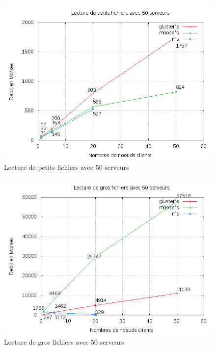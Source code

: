 \documentclass[12pt]{report}
\begin{document}
\begin{figure}[H]
\begin{center}
\includegraphics[bb=0 0 640 480,width=12cm]{images/srv50rs2.png}
\caption{Lecture de petits fichiers avec 50 serveurs}
\end{center}
\end{figure} 
\begin{figure}[H]
\begin{center}
\includegraphics[bb=0 0 640 480,width=12cm]{images/srv50rb2.png}
\caption{Lecture de gros fichiers avec 50 serveurs}
\end{center}
\end{figure} 
      \newpage
\end{document}
